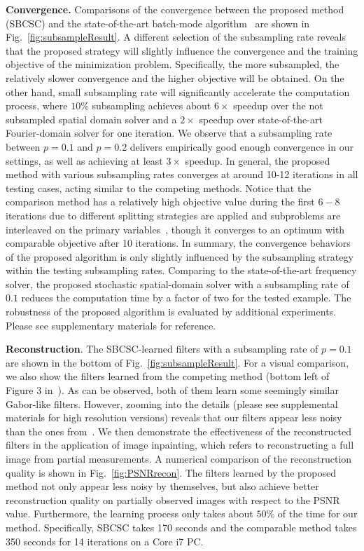 {\bfseries Convergence.} Comparisons of the convergence between the
proposed method (SBCSC) and the state-of-the-art batch-mode
algorithm~\cite{heide2015fast} are shown in
Fig.~\ref{fig:subsampleResult}. A different selection of the
subsampling rate reveals that the proposed strategy will slightly
influence the convergence and the training objective of the
minimization problem. Specifically, the more subsampled, the
relatively slower convergence and the higher objective will be
obtained. On the other hand, small subsampling rate will significantly
accelerate the computation process, where $10\%$ subsampling achieves
about $6 \times$ speedup over the not subsampled spatial domain solver
and a $2 \times$ speedup over state-of-the-art Fourier-domain solver
for one iteration. We observe that a subsampling rate between $p=0.1$
and $p=0.2$ delivers empirically good enough convergence in our
settings, as well as achieving at least $3 \times$ speedup. In
general, the proposed method with various subsampling rates converges
at around 10-12 iterations in all testing cases, acting similar to the
competing methods.
Notice that the comparison method has a relatively
high objective value during the first $6-8$ iterations due to
different splitting strategies are applied and subproblems are
interleaved on the primary variables~\cite{wohlberg2016efficient},
though it converges to an optimum with comparable objective after 10
iterations. In summary, the convergence behaviors of the proposed
algorithm is only slightly influenced by the subsampling strategy
within the testing subsampling rates. Comparing to the
state-of-the-art frequency solver, the proposed stochastic
spatial-domain solver with a subsampling rate of $0.1$ reduces the
computation time by a factor of two for the tested example. The
robustness of the proposed algorithm is evaluated by additional
experiments. Please see supplementary materials for reference.

{\bfseries Reconstruction}. The SBCSC-learned filters with a
subsampling rate of $p=0.1$ are shown in the bottom of
Fig.~\ref{fig:subsampleResult}. For a visual comparison, we also show
the filters learned from the competing method (bottom left of Figure 3
in~\cite{heide2015fast}). As can be observed, both of them learn some
seemingly similar Gabor-like filters. However, zooming into the
details (please see supplemental materials for high resolution
versions) reveals that our filters appear less noisy than the ones
from~\cite{heide2015fast}. We then demonstrate the effectiveness of
the reconstructed filters in the application of image inpainting,
which refers to reconstructing a full image from partial
measurements. A numerical comparison of the reconstruction quality is
shown in Fig.~\ref{fig:PSNRrecon}. The filters learned by the proposed
method not only appear less noisy by themselves, but also achieve
better reconstruction quality on partially observed images with
respect to the PSNR value. Furthermore, the learning process
only takes about $50\%$ of the time for our method. Specifically, SBCSC takes 170 seconds and the comparable method takes 350 seconds for 14 iterations on a Core i7 PC.

